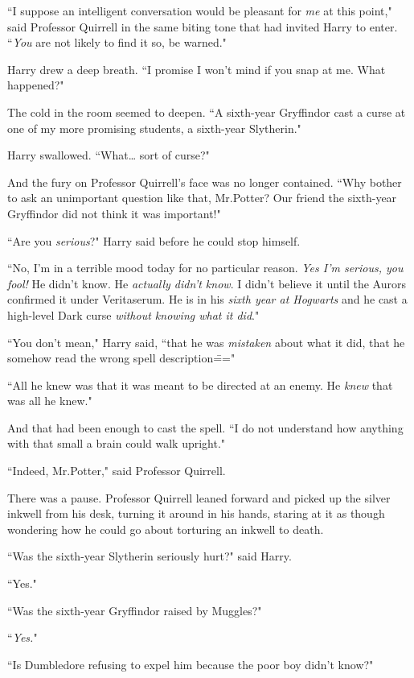 ``I suppose an intelligent conversation would be pleasant for \emph{me} at this point," said Professor Quirrell in the same biting tone that had invited Harry to enter. ``\emph{You} are not likely to find it so, be warned."

Harry drew a deep breath. ``I promise I won't mind if you snap at me. What happened?"

The cold in the room seemed to deepen. ``A sixth-year Gryffindor cast a curse at one of my more promising students, a sixth-year Slytherin."

Harry swallowed. ``What{\ldots} sort of curse?"

And the fury on Professor Quirrell's face was no longer contained. ``Why bother to ask an unimportant question like that, Mr.\?Potter? Our friend the sixth-year Gryffindor did not think it was important!"

``Are you \emph{serious}?" Harry said before he could stop himself.

``No, I'm in a terrible mood today for no particular reason. \emph{Yes I'm serious, you fool!} He didn't know. He \emph{actually didn't know}. I didn't believe it until the Aurors confirmed it under Veritaserum. He is in his \emph{sixth year at Hogwarts} and he cast a high-level Dark curse \emph{without knowing what it did}."

``You don't mean," Harry said, ``that he was \emph{mistaken} about what it did, that he somehow read the wrong spell description\==="

``All he knew was that it was meant to be directed at an enemy. He \emph{knew} that was all he knew."

And that had been enough to cast the spell. ``I do not understand how anything with that small a brain could walk upright."

``Indeed, Mr.\?Potter," said Professor Quirrell.

There was a pause. Professor Quirrell leaned forward and picked up the silver inkwell from his desk, turning it around in his hands, staring at it as though wondering how he could go about torturing an inkwell to death.

``Was the sixth-year Slytherin seriously hurt?" said Harry.

``Yes."

``Was the sixth-year Gryffindor raised by Muggles?"

``\emph{Yes.}"

``Is Dumbledore refusing to expel him because the poor boy didn't know?"

